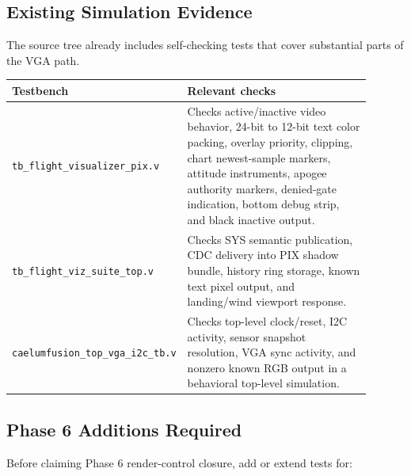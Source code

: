 \documentclass{article}
\newcommand{\file}[1]{\begingroup\nolinkurl{#1}\endgroup}
\begin{document}
\subsection{Existing Simulation Evidence}

The source tree already includes self-checking tests that cover substantial
parts of the VGA path.

\begin{longtable}{p{0.32\linewidth} p{0.58\linewidth}}
\toprule
\textbf{Testbench} & \textbf{Relevant checks} \\
\midrule
\endhead
\file{tb_flight_visualizer_pix.v} &
Checks active/inactive video behavior, 24-bit to 12-bit text color packing,
overlay priority, clipping, chart newest-sample markers, attitude instruments,
apogee authority markers, denied-gate indication, bottom debug strip, and black
inactive output. \\

\file{tb_flight_viz_suite_top.v} &
Checks SYS semantic publication, CDC delivery into PIX shadow bundle, history
ring storage, known text pixel output, and landing/wind viewport response. \\

\file{caelumfusion_top_vga_i2c_tb.v} &
Checks top-level clock/reset, I2C activity, sensor snapshot resolution, VGA sync
activity, and nonzero known RGB output in a behavioral top-level simulation. \\
\bottomrule
\end{longtable}

\subsection{Phase 6 Additions Required}

Before claiming Phase 6 render-control closure, add or extend tests for:
\end{document}
